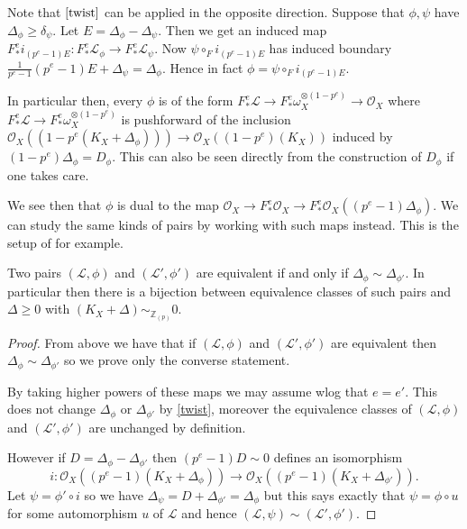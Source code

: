 \documentclass[a4paper,12pt]{book}
\newcommand{\Fe}[1][e]{F^{#1}_{*}}
\newcommand{\ox}[1][X]{\mathcal{O}_{#1}}
\newcommand{\zp}{\mathbb{Z}_{(p)}}
\begin{document}
Note that $\autoref{twist}$ can be applied in the opposite direction. Suppose that $\phi,\psi$ have $\Delta_{\phi} \geq \delta_{\psi}$. Let $E=\Delta_{\phi}-\Delta_{\psi}$. Then we get an induced map $\Fe i_{(p^{e}-1)E} \colon \Fe \mathcal{L}_{\phi} \to \Fe \mathcal{L}_{\psi}$. Now $\psi \circ_{F} i_{(p^{e}-1)E}$ has induced boundary $\frac{1}{p^{e}-1}(p^{e}-1)E+\Delta_{\psi}=\Delta_{\phi}$. Hence in fact $\phi=\psi \circ_{F} i_{(p^{e}-1)E}$.

In particular then, every $\phi$ is of the form $\Fe \mathcal{L} \to \Fe \omega_{X}^{\otimes(1-p^{e})} \to \ox$ where $\Fe \mathcal{L} \to \Fe \omega_{X}^{\otimes(1-p^{e})}$ is pushforward of the inclusion $\ox((1-p^{e}(K_{X}+\Delta_{\phi}))) \to \ox((1-p^{e})(K_{X}))$ induced by $(1-p^{e})\Delta_{\phi}=D_{\phi}$. This can also be seen directly from the construction of $D_{\phi}$ if one takes care.

We see then that $\phi$ is dual to the map $\ox \to \Fe\ox \to \Fe\ox((p^{e}-1)\Delta_{\phi})$. We can study the same kinds of pairs by working with such maps instead. This is the setup of \cite{schwede2010globally} for example.


\begin{lemma}
	
	Two pairs $(\mathcal{L}, \phi)$ and $(\mathcal{L}', \phi')$ are equivalent if and only if $\Delta_{\phi}\sim \Delta_{\phi'}$. In particular then there is a bijection between equivalence classes of such pairs and $\Delta \geq 0$ with $(K_{X}+\Delta)\sim_{\zp} 0$.
	
	
	\end{lemma}

\begin{proof}
	
	From above we have that if $(\mathcal{L}, \phi)$ and $(\mathcal{L}', \phi')$ are equivalent then $\Delta_{\phi}\sim \Delta_{\phi'}$ so we prove only the converse statement.
	
	By taking higher powers of these maps we may assume wlog that $e=e'$. This does not change $\Delta_{\phi}$ or $\Delta_{\phi'}$ by \autoref{twist}, moreover the equivalence classes of $(\mathcal{L}, \phi)$ and $(\mathcal{L}', \phi')$ are unchanged by definition.
	
	However if $D=\Delta_{\phi}-\Delta_{\phi'}$ then $(p^{e}-1)D \sim 0$ defines an isomorphism $$i:\ox((p^{e}-1)(K_{X}+\Delta_{\phi}))\to \ox ((p^{e}-1)(K_{X}+\Delta_{\phi'})).$$ Let $\psi=\phi' \circ i$ so we have $\Delta_{\psi}=D+\Delta_{\phi'}=\Delta_{\phi}$ but this says exactly that $\psi=\phi\circ u$ for some automorphism $u$ of $\mathcal{L}$ and hence $(\mathcal{L},\psi)\sim(\mathcal{L'},\phi')$. 
	
\end{proof}
\end{document}
